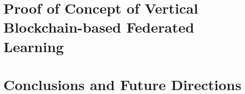 \documentclass[12pt,a4paper,oneside]{book}
\begin{document}
\chapter{Proof of Concept of Vertical Blockchain-based Federated Learning}\label{chapter:vertical}


\chapter{Conclusions and Future Directions}\label{chapter:conclusion}





\end{document}
